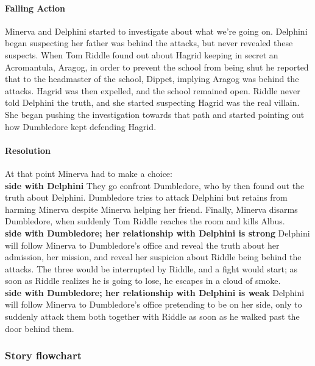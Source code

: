 \paragraph{Falling Action}
Minerva and Delphini started to investigate about what we're going on. Delphini began suspecting her father was behind the attacks, but never revealed these suspects.
When Tom Riddle found out about Hagrid keeping in secret an Acromantula, Aragog, in order to prevent the school from being shut he reported that to the headmaster of the school, Dippet, implying Aragog was behind the attacks. Hagrid was then expelled,  and the school remained open.
Riddle never told Delphini the truth, and she started suspecting Hagrid was the real villain. She began pushing the investigation towards that path  and started pointing out how Dumbledore kept defending Hagrid.

\paragraph{Resolution}
At that point Minerva had to make a choice: \\

\textbf{side with Delphini}
They go confront Dumbledore, who by then found out the truth about Delphini. Dumbledore tries to attack Delphini but retains from harming Minerva despite Minerva helping her friend. Finally, Minerva disarms Dumbledore, when suddenly Tom Riddle reaches the room and kills Albus.\\

\textbf{side with Dumbledore; her relationship with Delphini is strong}
Delphini will follow Minerva to Dumbledore's office and reveal the truth about her admission, her mission, and reveal her suspicion about Riddle being behind the attacks. The three would be interrupted by Riddle, and a fight would start; as soon as Riddle realizes he is going to lose, he escapes in a cloud of smoke.\\

\textbf{side with Dumbledore; her relationship with Delphini is weak}
Delphini will follow Minerva to Dumbledore's office pretending to be on her side, only to suddenly attack them both together with Riddle as soon as he walked past the door behind them.

\subsubsection*{Story flowchart}

